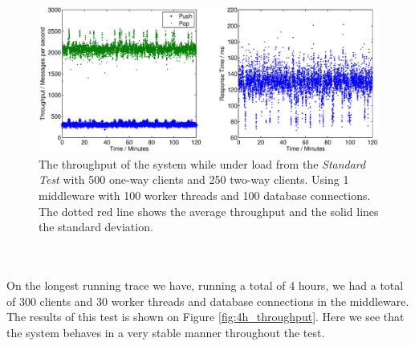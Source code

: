 \documentclass{article}
\begin{document}
            \begin{figure}[H]
                \hspace{-1.5cm}
                \includegraphics[scale=0.750]{2h_100threads_standardTest_500_250}
                \caption{The throughput of the system while under load from the \textit{Standard Test} with 500 one-way clients and 250 two-way clients. Using 1 middleware with 100 worker threads and 100 database connections. The dotted red line shows the average throughput and the solid lines the standard deviation.}
                \label{fig:2h_100threads_standardTest_500_250}
            \end{figure}
            ~\\
            \\
            On the longest running trace we have, running a total of 4 hours, we had a total of 300 clients and 30 worker threads and database connections in the middleware. The results of this test is shown on Figure \ref{fig:4h_throughput}. Here we see that the system behaves in a very stable manner throughout the  test.
\end{document}
